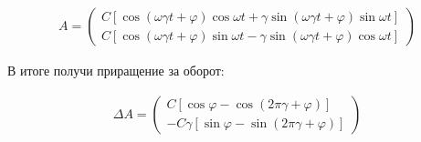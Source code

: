 \documentclass[a4paper]{article}
\newcommand{\inner}[1]{\left( #1 \right)}
\newcommand{\insqr}[1]{\left[ #1 \right]}
\renewcommand{\phi}{\varphi}
\numberwithin{equation}{section}
\begin{document}
\begin{gather}
    A =
    \begin{pmatrix}
        C \insqr{\cos \inner{\omega \gamma t + \phi} \cos \omega t 
        + \gamma \sin  \inner{\omega \gamma t + \phi} \sin \omega t} \\
        C \insqr{\cos \inner{\omega \gamma t + \phi} \sin \omega t -
        \gamma \sin \inner{\omega \gamma t + \phi} \cos \omega t}
    \end{pmatrix}
\end{gather}

В итоге получи приращение за оборот:

\begin{gather}
    \Delta A = 
    \begin{pmatrix}
        C \insqr{\cos \phi - \cos(2\pi\gamma + \phi)}\\
        - C \gamma \insqr{\sin \phi - \sin(2\pi\gamma + \phi)}
    \end{pmatrix}
\end{gather}
\end{document}
